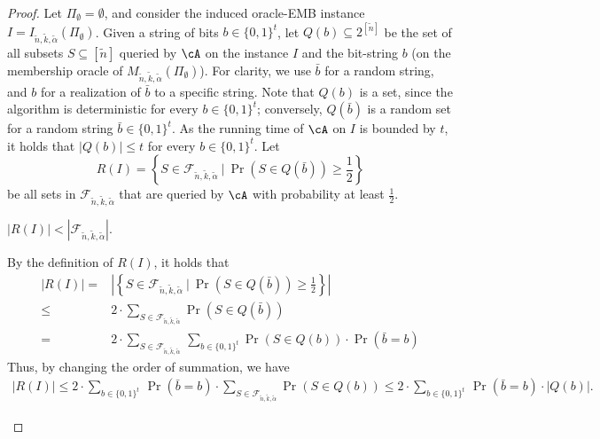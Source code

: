 \begin{proof}
		 
		 Let $\Pi_{\emptyset} = \emptyset$, and consider the induced oracle-EMB instance $I = I_{\tilde{n},\tilde{k},\tilde{\alpha}}(\Pi_{\emptyset})$. Given a string of bits $b \in \{0,1\}^{t}$, let $Q(b) \subseteq 2^{[\tilde{n}]}$ be the set of  all subsets $S \subseteq [\tilde{n}]$ queried by $\cA$ on the instance $I$ and the bit-string $b$ (on the membership oracle of $M_{\tilde{n},\tilde{k},\tilde{\alpha}}(\Pi_{\emptyset})$). For clarity, we use $\bar{b}$ for a random string, and $b$ for a realization of $\bar{b}$ to a specific string. Note that $Q(b)$ is a set, since the algorithm is deterministic for every $b \in \{0,1\}^{t}$; conversely, $Q(\bar{b})$ is a random set for a random string $\bar{b} \in \{0,1\}^{t}$. As the running time of $\cA$ on %
		$I$ is bounded by $t$, it holds that $|Q(b)| \leq t$ for every $b \in \{0,1\}^{t}$. Let 
		\begin{equation*}
			\label{eq:R}
			R(I) = \left\{S \in \mathcal{F}_{\tilde{n},\tilde{k},\tilde{\alpha}}~\bigg|~\Pr \left(S \in Q(\bar{b}) \right) \geq \frac{1}{2} \right\}
		\end{equation*} be all sets in $ \mathcal{F}_{\tilde{n},\tilde{k},\tilde{\alpha}}$ that are queried by $\cA$ with probability  at least $\frac{1}{2}$. 
			\begin{claim}
			\label{claim:H3}
			$|R(I)|  < |\mathcal{F}_{\tilde{n},\tilde{k},\tilde{\alpha}}|$. 
		\end{claim}
		\begin{claimproof}
			By the definition of $R(I)$, it holds that 
				\begin{equation*}
				\label{eq:R0}
				\begin{aligned}
					|R(I)| ={} & \left| \left\{S \in \mathcal{F}_{\tilde{n},\tilde{k},\tilde{\alpha}}~\bigg|~\Pr \left(S \in Q(\bar{b}) \right) \geq \frac{1}{2} \right\} \right| \\
					\leq{} & 2 \cdot \sum_{S \in \mathcal{F}_{\tilde{n},\tilde{k},\tilde{\alpha}}} \Pr \left(S \in Q(\bar{b}) \right)  \\
					={} & 	 2 \cdot \sum_{S \in \mathcal{F}_{\tilde{n},\tilde{k},\tilde{\alpha}}~} \sum_{b \in \{0,1\}^{t}} \Pr \left(S \in Q(b) \right) \cdot \Pr(\bar{b} = b)
				\end{aligned}
			\end{equation*} Thus, by changing the order of summation, we have 
				\begin{equation*}
				\begin{aligned}
					|R(I)| \leq 2 \cdot  \sum_{b \in \{0,1\}^{t}~} \Pr(\bar{b} = b) \cdot \sum_{S \in \mathcal{F}_{\tilde{n},\tilde{k},\tilde{\alpha}}} \Pr \left(S \in Q(b) \right) 
					\leq 2 \cdot  \sum_{b \in \{0,1\}^{t}~} \Pr(\bar{b} = b) \cdot |Q(b)| .
				\end{aligned}
			\end{equation*} 
			

\end{claimproof}
\end{proof}

